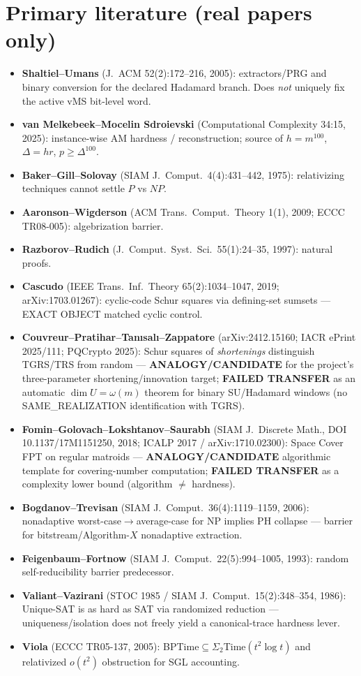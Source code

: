 \documentclass[11pt]{article}
\begin{document}
\section*{Primary literature (real papers only)}
\begin{itemize}
\item \textbf{Shaltiel--Umans} (J.~ACM 52(2):172--216, 2005): extractors/PRG and binary conversion
for the declared Hadamard branch. Does \emph{not} uniquely fix the active vMS bit-level word.
\item \textbf{van Melkebeek--Mocelin Sdroievski} (Computational Complexity 34:15, 2025):
instance-wise AM hardness / reconstruction; source of $h=m^{100}$, $\Delta=hr$, $p\ge\Delta^{100}$.
\item \textbf{Baker--Gill--Solovay} (SIAM J.\ Comput.\ 4(4):431--442, 1975): relativizing techniques
cannot settle $P$ vs $NP$.
\item \textbf{Aaronson--Wigderson} (ACM Trans.\ Comput.\ Theory 1(1), 2009; ECCC TR08-005):
algebrization barrier.
\item \textbf{Razborov--Rudich} (J.\ Comput.\ Syst.\ Sci.\ 55(1):24--35, 1997): natural proofs.
\item \textbf{Cascudo} (IEEE Trans.\ Inf.\ Theory 65(2):1034--1047, 2019; arXiv:1703.01267):
cyclic-code Schur squares via defining-set sumsets --- EXACT OBJECT matched cyclic control.
\item \textbf{Couvreur--Pratihar--Tan{\i}sal{\i}--Zappatore} (arXiv:2412.15160; IACR ePrint 2025/111;
PQCrypto 2025): Schur squares of \emph{shortenings} distinguish TGRS/TRS from random ---
\textbf{ANALOGY/CANDIDATE} for the project's three-parameter shortening/innovation target;
\textbf{FAILED TRANSFER} as an automatic $\dim U=\omega(m)$ theorem for binary SU/Hadamard
windows (no SAME\_REALIZATION identification with TGRS).
\item \textbf{Fomin--Golovach--Lokshtanov--Saurabh} (SIAM J.\ Discrete Math., DOI 10.1137/17M1151250,
2018; ICALP 2017 / arXiv:1710.02300): Space Cover FPT on regular matroids ---
\textbf{ANALOGY/CANDIDATE} algorithmic template for covering-number computation; \textbf{FAILED
TRANSFER} as a complexity lower bound (algorithm $\neq$ hardness).
\item \textbf{Bogdanov--Trevisan} (SIAM J.\ Comput.\ 36(4):1119--1159, 2006): nonadaptive
worst-case$\to$average-case for NP implies PH collapse --- barrier for bitstream/Algorithm-$X$
nonadaptive extraction.
\item \textbf{Feigenbaum--Fortnow} (SIAM J.\ Comput.\ 22(5):994--1005, 1993): random self-reducibility
barrier predecessor.
\item \textbf{Valiant--Vazirani} (STOC 1985 / SIAM J.\ Comput.\ 15(2):348--354, 1986): Unique-SAT is
as hard as SAT via randomized reduction --- uniqueness/isolation does not freely yield a
canonical-trace hardness lever.
\item \textbf{Viola} (ECCC TR05-137, 2005): BPTime$\subseteq\Sigma_2$Time$(t^2\log t)$ and relativized
$o(t^2)$ obstruction for SGL accounting.
\end{itemize}
\end{document}
